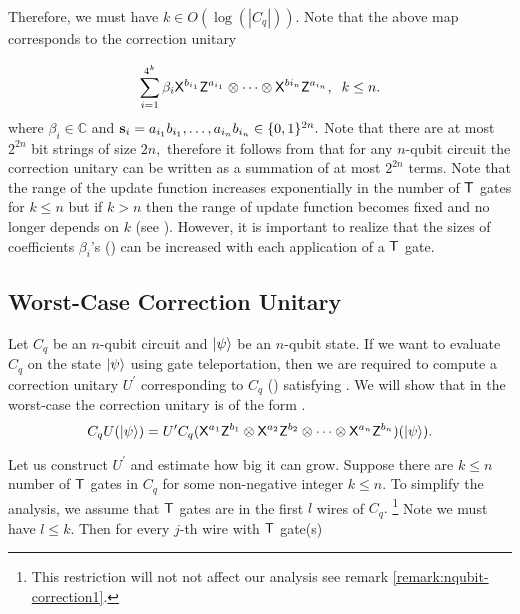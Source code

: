 Therefore, we must have $k\in O(\log(|C_q|))$.  Note that the above map corresponds to the correction unitary 



 \begin{equation}
\label{exp:nqubit-correction}
\sum_{i=1}^{4^k} \beta_i {\sf X}^{b_{i_1}} {\sf Z}^{a_{i_1}}\otimes \cdots \otimes {\sf X}^{b{i_n}} {\sf Z}^{a_{i_n}},\;  \; k\leq n.
\end{equation}
where $\beta_i\in\mathbb{C}$ and ${\bf s}_i=a_{i_1}b_{i_1}, \ldots, a_{i_n}b_{i_n} \in\{0,1\}^{2n}.$  Note that there are at most $2^{2n}$ bit strings of size $2n,$ therefore it follows from  that for any $n$-qubit circuit the correction unitary can be written as a summation of at most $2^{2n}$ terms. Note that the range of the update function increases exponentially in the number of ${\sf T}$ gates for $k\leq n$ but if $k>n$ then the range of update function becomes fixed and no longer depends on $k$ (see ). However, it is important to realize that the sizes of coefficients $\beta_i$'s () can be increased with each application of a ${\sf T}$ gate.

\subsection{Worst-Case Correction Unitary}
Let $C_q$ be an $n$-qubit circuit and ${\lvert}\psi\rangle$ be an $n$-qubit state. If we want to evaluate $C_q$ on the state ${\lvert}\psi\rangle$ using gate teleportation, then we are required to compute a correction unitary $U^\prime$ corresponding to $C_q$ () satisfying . We will show that in the worst-case the correction unitary is of the form . %
\begin{equation}
\label{nqubit:eq6}
C_qU({\lvert}\psi\rangle)= U^\prime C_q ({\sf X}^{a_{1}}{\sf Z}^{b_{1}}\otimes {\sf X}^{a_{2}}{\sf Z}^{b_{2}}\otimes \cdots \otimes {\sf X}^{a_{n}}{\sf Z}^{b_{n}})({\lvert}\psi\rangle).
\end{equation}

Let us construct $U^\prime$ and estimate how big it can grow. Suppose there are $k\leq n$ number of ${\sf T}$ gates in $C_q$ for some non-negative integer $k\leq n.$ To simplify the analysis, we assume that ${\sf T}$ gates are in the first $l$ wires of $C_q.$  \footnote{This restriction will not not affect our analysis see remark \cref{remark:nqubit-correction1}.} Note we must have $l\leq k.$ Then for every $j$-th wire with ${\sf T}$ gate(s) %

